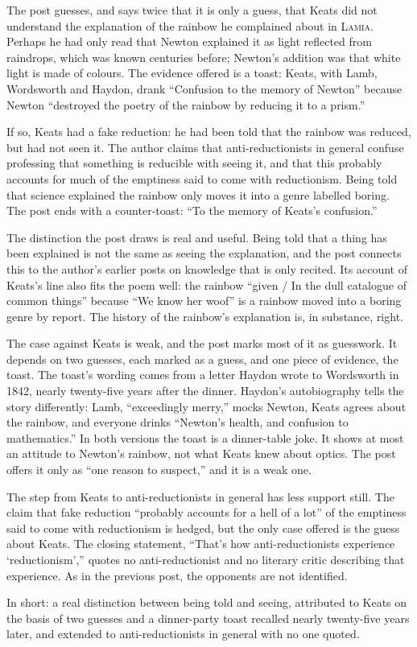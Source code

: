 \begin{afterword}
\summaryhead

The post guesses, and says twice that it is only a guess, that Keats did not understand the explanation of the rainbow he complained about in \textsc{Lamia}. Perhaps he had only read that Newton explained it as light reflected from raindrops, which was known centuries before; Newton's addition was that white light is made of colours. The evidence offered is a toast: Keats, with Lamb, Wordsworth and Haydon, drank ``Confusion to the memory of Newton'' because Newton ``destroyed the poetry of the rainbow by reducing it to a prism.''

If so, Keats had a fake reduction: he had been told that the rainbow was reduced, but had not seen it. The author claims that anti-reductionists in general confuse professing that something is reducible with seeing it, and that this probably accounts for much of the emptiness said to come with reductionism. Being told that science explained the rainbow only moves it into a genre labelled boring. The post ends with a counter-toast: ``To the memory of Keats's confusion.''

\responsehead

The distinction the post draws is real and useful. Being told that a thing has been explained is not the same as seeing the explanation, and the post connects this to the author's earlier posts on knowledge that is only recited. Its account of Keats's line also fits the poem well: the rainbow ``given / In the dull catalogue of common things'' because ``We know her woof'' is a rainbow moved into a boring genre by report. The history of the rainbow's explanation is, in substance, right.

The case against Keats is weak, and the post marks most of it as guesswork. It depends on two guesses, each marked as a guess, and one piece of evidence, the toast. The toast's wording comes from a letter Haydon wrote to Wordsworth in 1842, nearly twenty-five years after the dinner. Haydon's autobiography tells the story differently: Lamb, ``exceedingly merry,'' mocks Newton, Keats agrees about the rainbow, and everyone drinks ``Newton's health, and confusion to mathematics.'' In both versions the toast is a dinner-table joke. It shows at most an attitude to Newton's rainbow, not what Keats knew about optics. The post offers it only as ``one reason to suspect,'' and it is a weak one.

The step from Keats to anti-reductionists in general has less support still. The claim that fake reduction ``probably accounts for a hell of a lot'' of the emptiness said to come with reductionism is hedged, but the only case offered is the guess about Keats. The closing statement, ``That's how anti-reductionists experience `reductionism','' quotes no anti-reductionist and no literary critic describing that experience. As in the previous post, the opponents are not identified.

In short: a real distinction between being told and seeing, attributed to Keats on the basis of two guesses and a dinner-party toast recalled nearly twenty-five years later, and extended to anti-reductionists in general with no one quoted.
\end{afterword}

